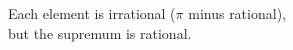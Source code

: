 \documentclass[preview]{standalone}
\begin{document}
\begin{center}
Each element is irrational ($\pi$ minus rational),\\but the supremum is rational.
\end{center}
\end{document}
